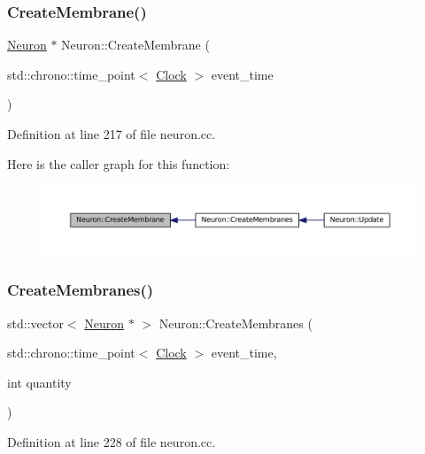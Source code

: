 \subsubsection{\texorpdfstring{Create\+Membrane()}{CreateMembrane()}}
{\footnotesize\ttfamily \mbox{\hyperlink{class_neuron}{Neuron}} $\ast$ Neuron\+::\+Create\+Membrane (\begin{DoxyParamCaption}\item[{std\+::chrono\+::time\+\_\+point$<$ \mbox{\hyperlink{universe_8h_a0ef8d951d1ca5ab3cfaf7ab4c7a6fd80}{Clock}} $>$}]{event\+\_\+time }\end{DoxyParamCaption})}



Definition at line 217 of file neuron.\+cc.

Here is the caller graph for this function\+:\nopagebreak
\begin{figure}[H]
\begin{center}
\leavevmode
\includegraphics[width=350pt]{class_neuron_af06efbcc1a96af0290673e9e048267cf_icgraph}
\end{center}
\end{figure}
\mbox{\label{class_neuron_a5f6f460c6a98319a05c3ba06d14e6f60}} 
\subsubsection{\texorpdfstring{Create\+Membranes()}{CreateMembranes()}}
{\footnotesize\ttfamily std\+::vector$<$ \mbox{\hyperlink{class_neuron}{Neuron}} $\ast$ $>$ Neuron\+::\+Create\+Membranes (\begin{DoxyParamCaption}\item[{std\+::chrono\+::time\+\_\+point$<$ \mbox{\hyperlink{universe_8h_a0ef8d951d1ca5ab3cfaf7ab4c7a6fd80}{Clock}} $>$}]{event\+\_\+time,  }\item[{int}]{quantity }\end{DoxyParamCaption})}



Definition at line 228 of file neuron.\+cc.


